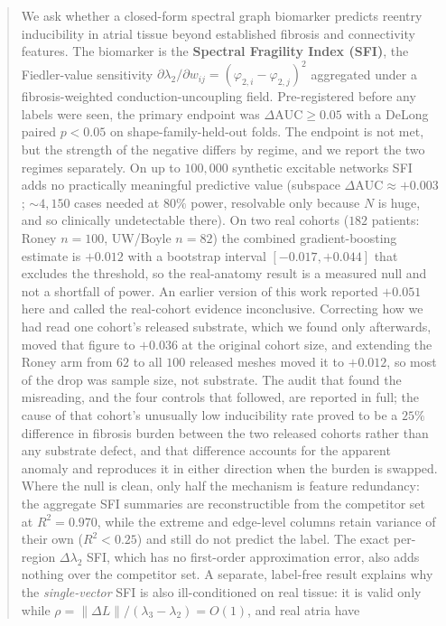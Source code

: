 \documentclass[11pt]{article}
\theoremstyle{definition}
\newcommand{\lam}{\lambda}
\newcommand{\phii}{\varphi}
\newcommand{\rhoval}{\rho}
\newcommand{\dAUC}{\Delta\mathrm{AUC}}
\begin{document}
\begin{abstract}
\noindent
We ask whether a closed-form spectral graph biomarker predicts reentry
inducibility in atrial tissue beyond established fibrosis and connectivity
features. The biomarker is the \textbf{Spectral Fragility Index (SFI)}, the
Fiedler-value sensitivity $\partial\lam_2/\partial w_{ij}=(\phii_{2,i}-\phii_{2,j})^2$
aggregated under a fibrosis-weighted conduction-uncoupling field. Pre-registered
before any labels were seen, the primary endpoint was $\dAUC\geq 0.05$ with a
DeLong paired $p<0.05$ on shape-family-held-out folds. The endpoint is not met,
but the strength of the negative differs by regime, and we report the two
regimes separately. On up to $100{,}000$ synthetic excitable networks SFI adds
no practically meaningful predictive value (subspace $\dAUC\approx+0.003$;
$\sim\!4{,}150$ cases needed at $80\%$ power, resolvable only because $N$ is
huge, and so clinically undetectable there). On two real cohorts ($182$
patients: Roney $n=100$, UW/Boyle $n=82$) the combined gradient-boosting
estimate is $+0.012$ with a bootstrap interval $[-0.017,+0.044]$ that excludes
the threshold, so the real-anatomy result is a measured null and not a
shortfall of power. An earlier version of this work reported $+0.051$ here and
called the real-cohort evidence inconclusive. Correcting how we had read one
cohort's released substrate, which we found only afterwards, moved that figure
to $+0.036$ at the original cohort size, and extending the Roney arm from $62$
to all $100$ released meshes moved it to $+0.012$, so most of the drop was
sample size, not substrate. The audit that found the misreading, and the four
controls that followed, are reported in full; the cause of that cohort's
unusually low inducibility rate proved to be a $25\%$ difference in fibrosis
burden between the two released cohorts rather than any substrate defect, and
that difference accounts for the apparent anomaly and reproduces it in either
direction when the burden is swapped. Where the null is clean, only half the
mechanism is feature redundancy: the aggregate SFI summaries are reconstructible
from the competitor set at $R^2=0.970$, while the extreme and edge-level columns
retain variance of their own ($R^2<0.25$) and still do not predict the label.
The exact per-region $\Delta\lam_2$ SFI, which has no first-order approximation
error, also adds nothing over the competitor set. A separate, label-free result
explains why the \emph{single-vector} SFI is also ill-conditioned on real
tissue: it is valid only while
$\rhoval=\lVert\Delta L\rVert/(\lam_3-\lam_2)=O(1)$, and real atria have

\end{abstract}
\end{document}

